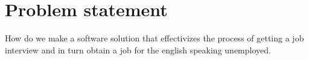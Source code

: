 \section{Problem statement}\label{sec:problem}
How do we make a software solution that effectivizes the process of getting a job interview and in turn obtain a job for the english speaking unemployed.